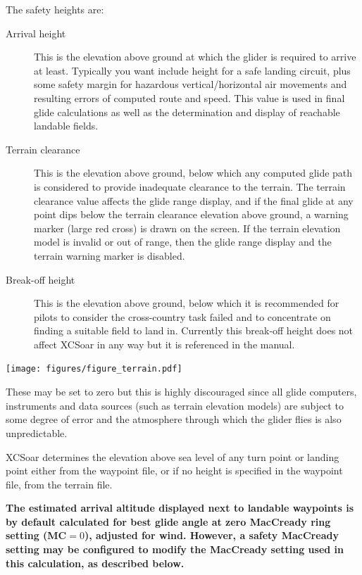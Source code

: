 The safety heights are:
\begin{description}
\item[Arrival height]  This is the elevation above ground at which
 the glider is required to arrive at least.
 Typically you want include height for a safe landing circuit, plus
 some safety margin for hazardous vertical/horizontal air movements and
 resulting errors of computed route and speed.
 This value is used in final glide calculations as
 well as the determination and display of reachable landable fields.
\item[Terrain clearance]
 This is the elevation above ground, below which any computed glide
 path is considered to provide inadequate clearance to the terrain.
 The terrain clearance value affects the glide range display, and if
 the final glide at any point dips below the terrain clearance
 elevation above ground, a warning marker (large red cross) is drawn
 on the screen.  If the terrain elevation model is invalid or out of
 range, then the glide range display and the terrain warning marker is
 disabled.
\item[Break-off height]  This is the elevation above ground, below which 
 it is recommended for pilots to consider the cross-country task
 failed and to concentrate on finding a suitable field to land in.
 Currently this break-off height does not affect XCSoar in any way but
 it is referenced in the manual.
\end{description}

\begin{maxipage}
\begin{center}
\texttt{[image: figures/figure\_terrain.pdf]}
\end{center}
\end{maxipage}

\warning
These may be set to zero but this is highly discouraged since all
glide computers, instruments and data sources (such as terrain
elevation models) are subject to some degree of error and the
atmosphere through which the glider flies is also unpredictable.

XCSoar determines the elevation above sea level of any turn point or
landing point either from the waypoint file, or if no height is
specified in the waypoint file, from the terrain file.

\textbf{The estimated arrival altitude displayed next to landable
  waypoints is by default calculated for best glide angle at zero
  MacCready ring setting (MC$=0$), adjusted for wind.  However, a
  safety MacCready setting may be configured to modify the MacCready
  setting used in this calculation, as described below.}

